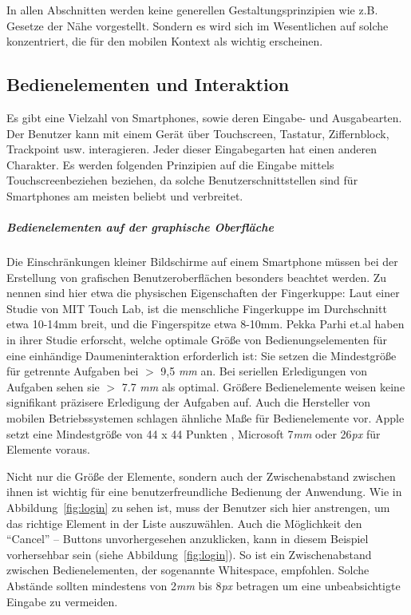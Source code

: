 In allen Abschnitten werden keine generellen Gestaltungsprinzipien wie z.B. Gesetze der Nähe vorgestellt. Sondern es wird sich im Wesentlichen auf solche konzentriert, die für den mobilen Kontext als wichtig erscheinen.

\subsection{Bedienelementen und Interaktion}
\label{sub:Benutzerschnittstellen}

Es gibt eine Vielzahl von Smartphones, sowie deren Eingabe- und Ausgabearten. Der Benutzer kann mit einem Gerät über Touchscreen, Tastatur, Ziffernblock, Trackpoint usw. interagieren. Jeder dieser Eingabegarten hat einen anderen Charakter. Es werden folgenden Prinzipien auf die Eingabe mittels Touchscreenbeziehen beziehen, da solche Benutzerschnittstellen sind für Smartphones am meisten beliebt und verbreitet.

\subparagraph{Bedienelementen auf der graphische Oberfläche} 
\label{subp:gro_ere_interface_elementen}

Die Einschränkungen kleiner Bildschirme auf einem Smartphone müssen bei der Erstellung von grafischen Benutzeroberflächen besonders beachtet werden. Zu nennen sind hier etwa die physischen Eigenschaften der Fingerkuppe: Laut einer Studie von MIT Touch Lab, ist die menschliche Fingerkuppe im Durchschnitt etwa 10-14mm breit, und die Fingerspitze etwa 8-10mm\cite{Srinivasan:2003uu}.  Pekka Parhi  et.al haben in ihrer Studie \cite{Parhi:2006gh} erforscht, welche optimale Größe von Bedienungselementen für eine einhändige Daumeninteraktion erforderlich ist: Sie setzen die Mindestgröße für getrennte Aufgaben bei $>$ 9,5 \textit{mm} an.  Bei seriellen Erledigungen von Aufgaben sehen sie $>$ 7.7 \textit{mm} als optimal. Größere Bedienelemente weisen keine signifikant präzisere Erledigung der Aufgaben auf.
Auch die Hersteller von mobilen Betriebssystemen schlagen ähnliche Maße für Bedienelemente vor. Apple setzt eine Mindestgröße von 44 x 44 Punkten \cite{Apple}, Microsoft 7\textit{mm} oder 26\textit{px}\cite{lukeGUI} für Elemente voraus.

Nicht nur die Größe der Elemente, sondern auch der Zwischenabstand zwischen ihnen ist wichtig für eine benutzerfreundliche Bedienung der Anwendung. Wie in Abbildung~\ref{fig:login} zu sehen ist, muss der Benutzer sich hier anstrengen, um das richtige Element in der Liste auszuwählen. Auch die Möglichkeit den “Cancel” – Buttons unvorhergesehen anzuklicken, kann in diesem Beispiel vorhersehbar sein (siehe Abbildung~\ref{fig:login}). So ist ein Zwischenabstand zwischen Bedienelementen, der sogenannte Whitespace,  empfohlen. Solche Abstände sollten mindestens von 2\textit{mm} bis 8\textit{px} betragen\cite{lukeGUI} um eine unbeabsichtigte Eingabe zu vermeiden.

